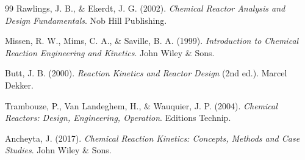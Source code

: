 \documentclass[11pt,a4paper]{article}
\begin{document}
\begin{thebibliography}{99}
Rawlings, J. B., \& Ekerdt, J. G. (2002). \textit{Chemical Reactor Analysis and Design Fundamentals}. Nob Hill Publishing.

Missen, R. W., Mims, C. A., \& Saville, B. A. (1999). \textit{Introduction to Chemical Reaction Engineering and Kinetics}. John Wiley \& Sons.

Butt, J. B. (2000). \textit{Reaction Kinetics and Reactor Design} (2nd ed.). Marcel Dekker.

Trambouze, P., Van Landeghem, H., \& Wauquier, J. P. (2004). \textit{Chemical Reactors: Design, Engineering, Operation}. Editions Technip.

Ancheyta, J. (2017). \textit{Chemical Reaction Kinetics: Concepts, Methods and Case Studies}. John Wiley \& Sons.

\end{thebibliography}
\end{document}
